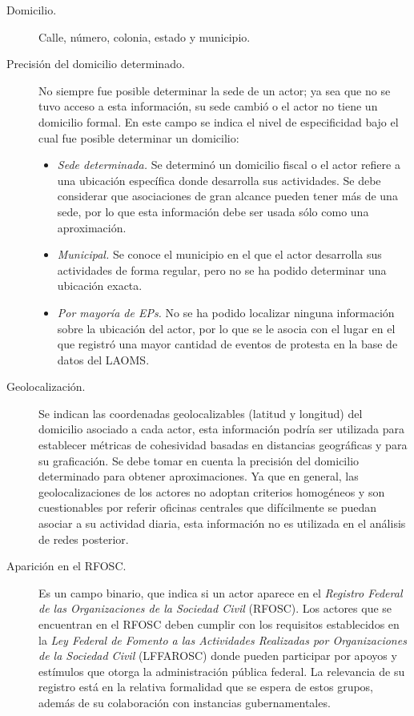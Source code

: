 \documentclass[letterpaper, 11pt]{book}
\theoremstyle{definition}
\theoremstyle{remark}
\begin{document}
\begin{description}
    \item[Domicilio.] Calle, número, colonia, estado y municipio.
    
    \item[Precisión del domicilio determinado.] No siempre fue posible determinar la sede de un actor; ya sea que no se tuvo acceso a esta información, su sede cambió o el actor no tiene un domicilio formal. En este campo se indica el nivel de especificidad bajo el cual fue posible determinar un domicilio:
    \begin{itemize}
        \item \emph{Sede determinada.} Se determinó un domicilio fiscal o el actor refiere a una ubicación específica donde desarrolla sus actividades. Se debe considerar que asociaciones de gran alcance pueden tener más de una sede, por lo que esta información debe ser usada sólo como una aproximación.
        \item \emph{Municipal.} Se conoce el municipio en el que el actor desarrolla sus actividades de forma regular, pero no se ha podido determinar una ubicación exacta.
        \item \emph{Por mayoría de EPs.} No se ha podido localizar ninguna información sobre la ubicación del actor, por lo que se le asocia con el lugar en el que registró una mayor cantidad de eventos de protesta en la base de datos del LAOMS.
    \end{itemize}
    
    \item[Geolocalización.] Se indican las coordenadas geolocalizables (latitud y longitud) del domicilio asociado a cada actor, esta información podría ser utilizada para establecer métricas de cohesividad basadas en distancias geográficas y para su graficación. 
    Se debe tomar en cuenta la precisión del domicilio determinado para obtener aproximaciones. 
    Ya que en general, las geolocalizaciones de los actores no adoptan criterios homogéneos y son cuestionables por referir oficinas centrales que difícilmente se puedan asociar a su actividad diaria, esta información no es utilizada en el análisis de redes posterior.
    
    \item[Aparición en el RFOSC.] Es un campo binario, que indica si un actor aparece en el \emph{Registro Federal de las Organizaciones de la Sociedad Civil} (RFOSC). 
    Los actores que se encuentran en el RFOSC deben cumplir con los requisitos establecidos en la \emph{Ley Federal de Fomento a las Actividades Realizadas por Organizaciones de la Sociedad Civil} (LFFAROSC) donde pueden participar por apoyos y estímulos que otorga la 
    administración pública federal. La relevancia de su registro está en la relativa formalidad que se espera de estos grupos, además de su colaboración con instancias gubernamentales.
    

\end{description}
\end{document}
